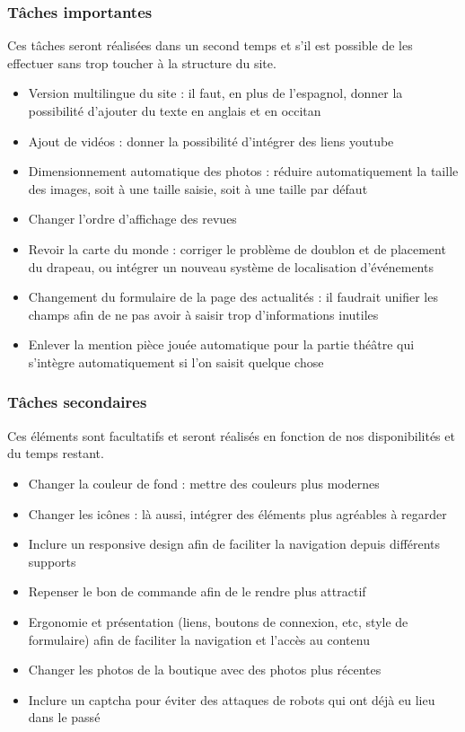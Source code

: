 \documentclass[11pt]{report}
\begin{document}
\subsubsection*{Tâches importantes}
Ces tâches seront réalisées dans un second temps et s'il est possible de les effectuer 
sans trop toucher à la structure du site.
\begin{itemize}
 \item Version multilingue du site : il faut, en plus de l'espagnol, donner la
possibilité d'ajouter du texte en anglais et en occitan 
 \item Ajout de vidéos : donner la possibilité d'intégrer des liens youtube
 \item Dimensionnement automatique des photos : réduire automatiquement la
taille des images, soit à une taille saisie, soit à une taille par défaut 
 \item Changer l'ordre d'affichage des revues
 \item Revoir la carte du monde : corriger le problème de doublon et de
placement du drapeau, ou intégrer un nouveau système de localisation 
d’événements
 \item Changement du formulaire de la page des actualités : il faudrait unifier
 les champs afin de ne pas avoir à saisir trop d'informations inutiles
 \item Enlever la mention \og pièce jouée \fg automatique pour la partie théâtre
 qui s'intègre automatiquement si l'on saisit quelque chose
\end{itemize}


\subsubsection*{Tâches secondaires}
Ces éléments sont facultatifs et seront réalisés en fonction de nos disponibilités et du temps restant.
\begin{itemize}
\item Changer la couleur de fond : mettre des couleurs plus modernes
\item Changer les icônes : là aussi, intégrer des éléments plus agréables à
regarder
\item Inclure un responsive design afin de faciliter la navigation depuis
différents supports
\item Repenser le bon de commande afin de le rendre plus attractif
\item Ergonomie et présentation (liens, boutons de connexion, etc, style de
formulaire) afin de faciliter la navigation et l'accès au contenu
\item Changer les photos de la boutique avec des photos plus récentes
\item Inclure un captcha pour éviter des attaques de robots qui ont déjà eu lieu
dans le passé
\end{itemize}
\end{document}
